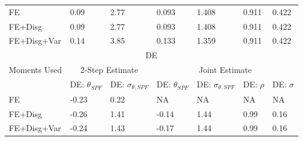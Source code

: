 \documentclass[12pt]{article}
\begin{document}
\begin{table}[p]
\begin{tabular}{lllllll}
			\hline 
		FE        & 0.09                                & 2.77                       & 0.093                     & 1.408                     & 0.911      & 0.422        \\
		FE+Disg      & 0.09                                & 2.77                       & 0.093                     & 1.408                     & 0.911      & 0.422        \\
		FE+Disg+Var  & 0.14                                & 3.85                       & 0.133                     & 1.359                     & 0.911      & 0.422        \\
			\hline 
		\multicolumn{7}{c}{DE}                                                                                                                                              \\
			\hline 
		Moments Used & \multicolumn{2}{c}{2-Step Estimate}                              & \multicolumn{4}{c}{Joint Estimate}                                                \\
			\hline 
		& DE: $\theta_{SPF}$                  & DE: $\sigma_{\theta,SPF}$  & DE: $\theta_{SPF}$        & DE: $\sigma_{\theta,SPF}$ & DE: $\rho$ & DE: $\sigma$ \\
			\hline 
		FE       & -0.23                               & 0.22                       & NA                        & NA                        & NA         & NA           \\
		FE+Disg      & -0.26                               & 1.41                       & -0.14                     & 1.44                      & 0.99       & 0.16         \\
		FE+Disg+Var  & -0.24                               & 1.43                       & -0.17                     & 1.44                      & 0.99       & 0.16       \\ 
			\hline 
	\end{tabular}
\end{table}
\end{document}
